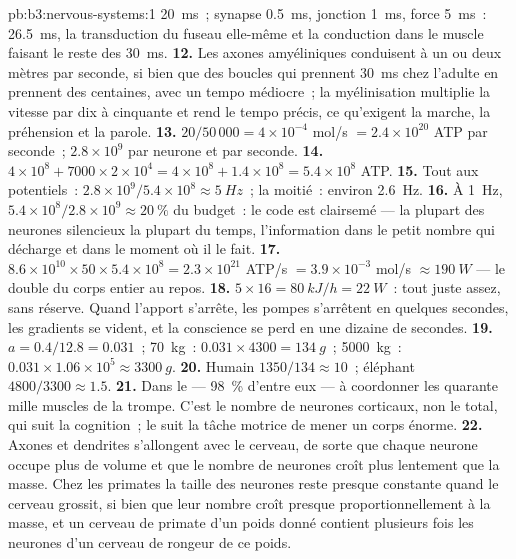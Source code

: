 \begin{solution}{pb:b3:nervous-systems:1}
\qty{20}{ms}~; synapse \qty{0.5}{ms}, jonction \qty{1}{ms}, force
\qty{5}{ms}~: \qty{26.5}{ms}, la transduction du fuseau elle-même et la
conduction dans le muscle faisant le reste des \qty{30}{ms}.
\textbf{12.} Les axones amyéliniques conduisent à un ou deux mètres par
seconde, si bien que des boucles qui prennent \qty{30}{ms} chez l'adulte
en prennent des centaines, avec un tempo médiocre~; la myélinisation
multiplie la vitesse par dix à cinquante et rend le tempo précis, ce
qu'exigent la marche, la préhension et la parole.
\textbf{13.} $20/50\,000 = 4\times 10^{-4}$ mol/s $= 2.4\times 10^{20}$
ATP par seconde~; $2.8\times 10^{9}$ par neurone et par seconde.
\textbf{14.} $4\times 10^{8} + 7000\times 2\times 10^{4} = 4\times 10^{8}
+ 1.4\times 10^{8} = 5.4\times 10^{8}$ ATP.
\textbf{15.} Tout aux potentiels~: $2.8\times 10^{9}/5.4\times 10^{8} \approx
\qty{5}{Hz}$~; la moitié~: environ \qty{2.6}{Hz}.
\textbf{16.} À \qty{1}{Hz}, $5.4\times 10^{8}/2.8\times 10^{9} \approx
\qty{20}{\%}$ du budget~: le code est clairsemé --- la plupart des
neurones silencieux la plupart du temps, l'information dans le petit
nombre qui décharge et dans le moment où il le fait.
\textbf{17.} $8.6\times 10^{10}\times 50\times 5.4\times 10^{8} = 2.3
\times 10^{21}$ ATP/s $= 3.9\times 10^{-3}$ mol/s $\approx \qty{190}{W}$
--- le double du corps entier au repos.
\textbf{18.} $5\times 16 = \qty{80}{kJ/h} = \qty{22}{W}$~: tout juste
assez, sans réserve. Quand l'apport s'arrête, les pompes s'arrêtent en
quelques secondes, les gradients se vident, et la conscience se perd en
une dizaine de secondes.
\textbf{19.} $a = 0.4/12.8 = 0.031$~; \qty{70}{kg}~: $0.031\times 4300 =
\qty{134}{g}$~; \qty{5000}{kg}~: $0.031\times 1.06\times 10^{5} \approx
\qty{3300}{g}$.
\textbf{20.} Humain $1350/134 \approx 10$~; éléphant $4800/3300 \approx
1.5$.
\textbf{21.} Dans le  --- \qty{98}{\%} d'entre eux --- à
coordonner les quarante mille muscles de la trompe. C'est le nombre de
neurones corticaux, non le total, qui suit la cognition~; le 
suit la tâche motrice de mener un corps énorme.
\textbf{22.} Axones et dendrites s'allongent avec le cerveau, de sorte
que chaque neurone occupe plus de volume et que le nombre de neurones
croît plus lentement que la masse. Chez les primates la taille des
neurones reste presque constante quand le cerveau grossit, si bien que
leur nombre croît presque proportionnellement à la masse, et un cerveau
de primate d'un poids donné contient plusieurs fois les neurones d'un
cerveau de rongeur de ce poids.

\end{solution}
